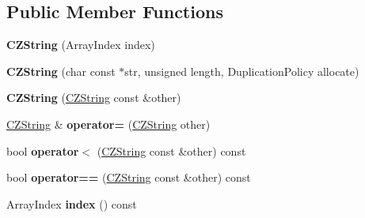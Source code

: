 \subsection*{Public Member Functions}
\begin{DoxyCompactItemize}
\item 
\hypertarget{class_json_1_1_value_1_1_c_z_string_a4b8aa6eaabdec78cffec96e088da996f}{}{\bfseries C\+Z\+String} (Array\+Index index)\label{class_json_1_1_value_1_1_c_z_string_a4b8aa6eaabdec78cffec96e088da996f}

\item 
\hypertarget{class_json_1_1_value_1_1_c_z_string_a86a86eaf0cf26d4c861d0daa359d608a}{}{\bfseries C\+Z\+String} (char const $\ast$str, unsigned length, Duplication\+Policy allocate)\label{class_json_1_1_value_1_1_c_z_string_a86a86eaf0cf26d4c861d0daa359d608a}

\item 
\hypertarget{class_json_1_1_value_1_1_c_z_string_a9685070d440335b55ef5c85747d25157}{}{\bfseries C\+Z\+String} (\hyperlink{class_json_1_1_value_1_1_c_z_string}{C\+Z\+String} const \&other)\label{class_json_1_1_value_1_1_c_z_string_a9685070d440335b55ef5c85747d25157}

\item 
\hypertarget{class_json_1_1_value_1_1_c_z_string_a6513ff431b0593d5744868dfee739f7b}{}\hyperlink{class_json_1_1_value_1_1_c_z_string}{C\+Z\+String} \& {\bfseries operator=} (\hyperlink{class_json_1_1_value_1_1_c_z_string}{C\+Z\+String} other)\label{class_json_1_1_value_1_1_c_z_string_a6513ff431b0593d5744868dfee739f7b}

\item 
\hypertarget{class_json_1_1_value_1_1_c_z_string_a5e88edf9f7443c77d6b70e409a0b5983}{}bool {\bfseries operator$<$} (\hyperlink{class_json_1_1_value_1_1_c_z_string}{C\+Z\+String} const \&other) const \label{class_json_1_1_value_1_1_c_z_string_a5e88edf9f7443c77d6b70e409a0b5983}

\item 
\hypertarget{class_json_1_1_value_1_1_c_z_string_af7a3b51ccf1bb205210c6b9a570093bc}{}bool {\bfseries operator==} (\hyperlink{class_json_1_1_value_1_1_c_z_string}{C\+Z\+String} const \&other) const \label{class_json_1_1_value_1_1_c_z_string_af7a3b51ccf1bb205210c6b9a570093bc}

\item 
\hypertarget{class_json_1_1_value_1_1_c_z_string_a4e9f305dbc4a4700abd955fde673a01c}{}Array\+Index {\bfseries index} () const \label{class_json_1_1_value_1_1_c_z_string_a4e9f305dbc4a4700abd955fde673a01c}


\end{DoxyCompactItemize}
